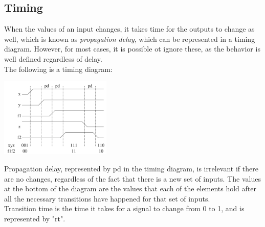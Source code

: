 \documentclass[nobib]{tufte-handout}
\begin{document}
\subsection{Timing}
When the values of an input changes, it takes time for the outputs to change as
well, which is known as \textit{propagation delay}, which can be represented in
a timing diagram. However, for most cases, it is possible ot ignore these, as
the behavior is well defined regardless of delay.\\ The following is a timing
diagram:\\
\begin{center}
    \includegraphics[width= 200px]{images/timing_table.png}
\end{center}
Propagation delay, represented by pd in the timing diagram, is irrelevant if there are no changes, regardless of the fact that there is a new set of inputs. The values at the bottom of the diagram are the values that each of the elements hold after all the necessary transitions have happened for that set of inputs.\\
Transition time is the time it takes for a signal to change from 0 to 1, and is represented by "rt".
\end{document}

